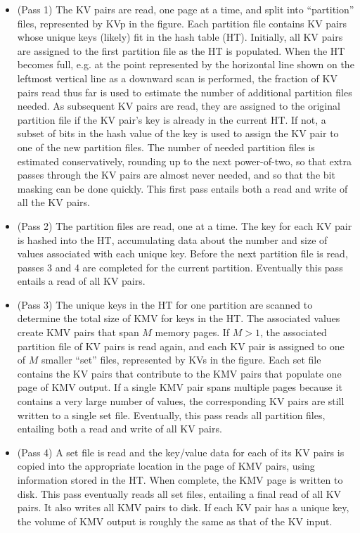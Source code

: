 \begin{itemize}

\item (Pass 1) The KV pairs are read, one page at a time, and split
into ``partition'' files, represented by KVp in the figure.  Each
partition file contains KV pairs whose unique keys (likely) fit
in the hash table (HT).  Initially, all KV pairs are assigned to the
first partition file as the HT is populated.  When the HT becomes
full, e.g. at the point represented by the horizontal line shown on
the leftmost vertical line as a downward scan is performed, the
fraction of KV pairs read thus far is used to estimate the number of
additional partition files needed.  As subsequent KV pairs are read,
they are assigned to the original partition file if the KV pair's
key is already in the current HT.  If not, a subset of bits in
the hash value of the key is used to assign the KV pair to one of the
new partition files.  The number of needed partition files is
estimated conservatively, rounding up to the next power-of-two, so
that extra passes through the KV pairs are almost never needed, and so
that the bit masking can be done quickly.  This first pass entails
both a read and write of all the KV pairs.

\item (Pass 2) The partition files are read, one at a time.  The key
for each KV pair is hashed into the HT, accumulating data about the
number and size of values associated with each unique key.  Before the
next partition file is read, passes 3 and 4 are completed for the
current partition.  Eventually this pass entails a read of all KV
pairs.

\item (Pass 3) The unique keys in the HT for one partition are
scanned to determine the total size of KMV for keys in the HT.  
The associated values create KMV pairs that span
$M$ memory pages.  If $M > 1$, the associated partition file of KV
pairs is read again, and each KV pair is assigned to one of $M$
smaller ``set'' files, represented by KVs in the figure.  Each set
file contains the KV pairs that contribute to the KMV pairs that
populate one page of KMV output.  If a single KMV pair spans
multiple pages because it contains a very large number of values,
the corresponding KV pairs are still written to a single set
file.  Eventually, this pass reads all partition files, entailing both
a read and write of all KV pairs.

\item (Pass 4) A set file is read and the key/value data for each of
its KV pairs is copied into the appropriate location in the page of
KMV pairs, using information stored in the HT.  When complete, the KMV
page is written to disk.  This pass eventually reads all set files,
entailing a final read of all KV pairs.  It also writes all KMV pairs
to disk.  If each KV pair has a unique key, the volume of KMV output
is roughly the same as that of the KV input.

\end{itemize}

